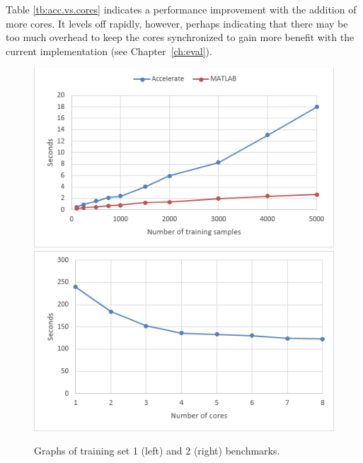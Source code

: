 \begin{table}
\centering
{}
	\caption{Benchmarking training set 2.}
	\label{tb:acc.vs.cores}
\end{table}

Table \ref{tb:acc.vs.cores} indicates a performance improvement with the addition of more cores. It levels off rapidly, however, perhaps indicating that there may be too much overhead to keep the cores synchronized to gain more benefit with the current implementation (see Chapter~\ref{ch:eval}).

\begin{figure}
\centerline{
	{\includegraphics[scale=0.5]{training1.png}}
	{\includegraphics[scale=0.5]{training2.png}}
	}
	\caption{Graphs of training set 1 (left) and 2 (right) benchmarks.}
	\label{fig:traininggraphs}
\end{figure}
